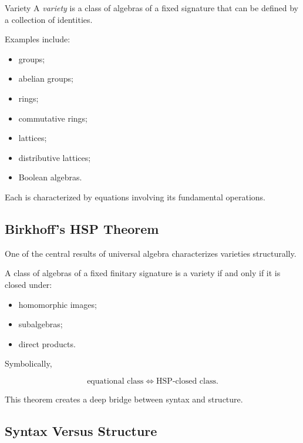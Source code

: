 \begin{definitionbox}{Variety}
A \emph{variety} is a class of algebras of a fixed signature that can be
defined by a collection of identities.
\end{definitionbox}

Examples include:

\begin{itemize}
    \item groups;
    \item abelian groups;
    \item rings;
    \item commutative rings;
    \item lattices;
    \item distributive lattices;
    \item Boolean algebras.
\end{itemize}

Each is characterized by equations involving its fundamental operations.

\subsection{Birkhoff's HSP Theorem}
\label{subsec:birkhoff-hsp}

One of the central results of universal algebra characterizes varieties
structurally.

\begin{theorem}
A class of algebras of a fixed finitary signature is a variety if and only
if it is closed under:
\begin{itemize}
    \item homomorphic images;
    \item subalgebras;
    \item direct products.
\end{itemize}
\end{theorem}

Symbolically,

\[ \boxed{\text{equational class}\iff\text{HSP-closed class}.} \]

This theorem creates a deep bridge between syntax and structure.

\subsection{Syntax Versus Structure}
\label{subsec:syntax-structure-universal}

